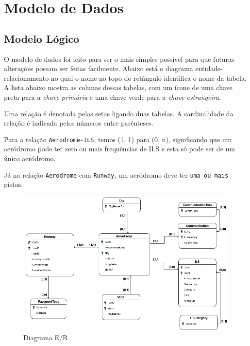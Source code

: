\chapter{Modelo de Dados}

\section{Modelo Lógico}

O modelo de dados foi feito para ser o mais simples possível para que futuras alterações
possam ser feitas facilmente. Abaixo está o diagrama entidade-relacionamento no qual
o nome no topo do retângulo identifica o nome da tabela. A lista abaixo mostra
as colunas dessas tabelas, com um ícone de uma chave preta para a \textit{chave primária} e 
uma chave verde para a \textit{chave estrangeira}.

Uma relação é denotada pelas setas ligando duas tabelas. A cardinalidade da relação é indicada
pelos números entre parênteses. 

Para a relação \texttt{Aerodrome-ILS}, temos (1, 1) para (0, n), significando que um aeródromo pode
ter zero ou mais frequências de ILS e esta só pode ser de um único aeródromo.

Já na relação \texttt{Aerodrome} com \texttt{Runway}, um aeródromo deve ter \texttt{uma ou mais} pistas.


\begin{figure}[ht]
    \begin{center}
    \includegraphics[width=400pt]{img/ERAero.png}
    \caption{Diagrama E/R}
    \label{fig:diagrama-er}
    \end{center}
\end{figure}

